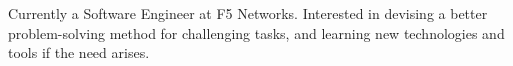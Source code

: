 

\begin{cvparagraph}

Currently a Software Engineer at F5 Networks.  Interested in devising a better problem-solving method for challenging tasks, and learning new technologies and tools if the need arises.
\end{cvparagraph}
